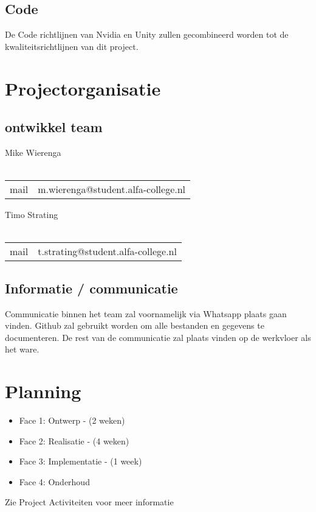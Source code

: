 \documentclass[]{report}
\begin{document}
\section{Code}		
De Code richtlijnen van Nvidia en Unity zullen gecombineerd worden tot de kwaliteitsrichtlijnen van dit project.




\chapter{Projectorganisatie}

\section{ontwikkel team}
Mike Wierenga \\ \\
\begin{tabular}{ l c }
	mail & m.wierenga@student.alfa-college.nl  \\
\end{tabular}

\vspace*{25px}

Timo Strating \\ \\
\begin{tabular}{ l c }
	mail & t.strating@student.alfa-college.nl  \\
\end{tabular}

\vspace*{25px}


\section{Informatie / communicatie}

Communicatie binnen het team zal voornamelijk via Whatsapp plaats gaan vinden. Github zal gebruikt worden om alle bestanden en gegevens te documenteren. De rest van de communicatie zal plaats vinden op de werkvloer als het ware.



\chapter{Planning}

\begin{itemize}
	\item Face 1: Ontwerp - (2 weken)	
	\item Face 2: Realisatie - (4 weken)	
	\item Face 3: Implementatie  - (1 week)	
	\item Face 4: Onderhoud 
		\newline
\end{itemize} 

Zie Project Activiteiten voor meer informatie
\end{document}
